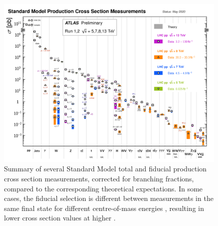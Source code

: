 \begin{figure}[tbp]
  \begin{center}
    \includegraphics[width=0.99\textwidth]{figs/rpvthreel/SMcrossSections.png}
  \end{center}
  \caption[Summary of several Standard Model total and fiducial production cross section measurements, corrected for branching fractions, compared to the corresponding theoretical expectations.]
          {Summary of several Standard Model total and fiducial production cross section measurements, corrected for branching fractions, compared to the corresponding theoretical expectations. In some cases, the fiducial selection is different between measurements in the same final state for different centre-of-mass energies \rts, resulting in lower cross section values at higher \rts \cite{ATL-PHYS-PUB-2020-010}.}
   \label{fig:SMxs}
\end{figure}


